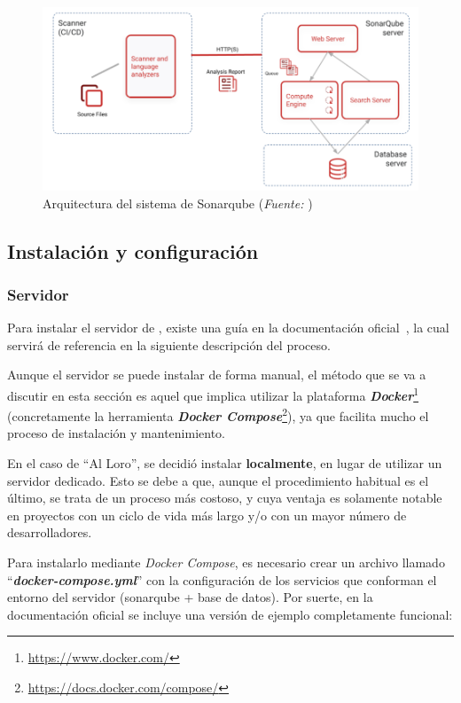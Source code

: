 \documentclass[11pt,spanish,listoffigures,listoftables,table,hyphens,dvipsnames]{tfgetsinf}
\newcommand{\fe}[1]{\foreign{english}{#1}}
\begin{document}
\begin{figure}[ht]
   \centering
   \includegraphics[width=\textwidth]{SQ-instance-components.png}
   \caption[Arquitectura del sistema de Sonarqube]{Arquitectura del sistema de Sonarqube (\emph{Fuente: }\cite{sonarqube-doc})
   \label{figura:sonarqube-system-arch}}
\end{figure}

\subsection{Instalación y configuración}

\subsubsection{Servidor}%

Para instalar el servidor de \textbf{\fe{Sonarqube}}, existe una guía en la documentación oficial~\cite{sonarqube-doc}, la cual servirá de referencia en la siguiente descripción del proceso.

Aunque el servidor se puede instalar de forma manual, el método que se va a discutir en esta sección es aquel que implica utilizar la plataforma \textbf{\emph{Docker}}\footnote{\url{https://www.docker.com/}} (concretamente la herramienta \textbf{\emph{Docker Compose}}\footnote{\url{https://docs.docker.com/compose/}}), ya que facilita mucho el proceso de instalación y mantenimiento.

En el caso de ``Al Loro'', se decidió instalar \textbf{localmente}, en lugar de utilizar un servidor dedicado. Esto se debe a que, aunque el procedimiento habitual es el último, se trata de un proceso más costoso, y cuya ventaja es solamente notable en proyectos con un ciclo de vida más largo y/o con un mayor número de desarrolladores.

Para instalarlo mediante \emph{Docker Compose}, es necesario crear un archivo llamado ``\textbf{\emph{docker-compose.yml}}'' con la configuración de los servicios que conforman el entorno del servidor (sonarqube + base de datos). Por suerte, en la documentación oficial se incluye una versión de ejemplo completamente funcional:
\end{document}
